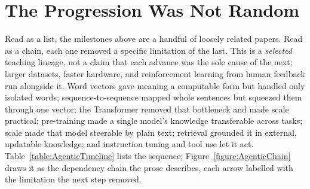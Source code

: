 \section{The Progression Was Not Random}
\label{section:NotRandom}

Read as a list, the milestones above are a handful of loosely related papers.
Read as a chain, each one removed a specific limitation of the last.
This is a \emph{selected} teaching lineage, not a claim that each advance was the sole cause of the next; larger datasets, faster hardware, and reinforcement learning from human feedback run alongside it.
Word vectors gave meaning a computable form but handled only isolated words; sequence-to-sequence mapped whole sentences but squeezed them through one vector; the Transformer removed that bottleneck and made scale practical; pre-training made a single model's knowledge transferable across tasks; scale made that model steerable by plain text; retrieval grounded it in external, updatable knowledge; and instruction tuning and tool use let it act.
Table~\ref{table:AgenticTimeline} lists the sequence; Figure~\ref{figure:AgenticChain} draws it as the dependency chain the prose describes, each arrow labelled with the limitation the next step removed.

